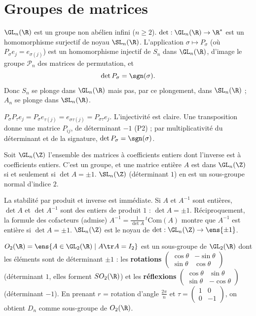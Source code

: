 \section{Groupes de matrices}
\begin{proposition}\label{prop-gl}
$\GL_n(\R)$ est un groupe non abélien infini ($n\ge2$). $\det:\GL_n(\R)\to\R^*$ est un homomorphisme surjectif de noyau $\SL_n(\R)$. L'application $\sigma\mapsto P_\sigma$ (où $P_\sigma e_j=e_{\sigma(j)}$) est un homomorphisme injectif de $S_n$ dans $\GL_n(\R)$, d'image le groupe $\mathcal P_n$ des matrices de permutation, et
\[\det P_\sigma=\sgn(\sigma).\]
Donc $S_n$ se plonge dans $\GL_n(\R)$ mais pas, par ce plongement, dans $\SL_n(\R)$ ; $A_n$ se plonge dans $\SL_n(\R)$.
\end{proposition}
\begin{preuve}
$P_\sigma P_\tau e_j=P_\sigma e_{\tau(j)}=e_{\sigma\tau(j)}=P_{\sigma\tau}e_j$. L'injectivité est claire. Une transposition donne une matrice $P_{ij}$, de déterminant $-1$ (P2) ; par multiplicativité du déterminant et de la signature, $\det P_\sigma=\sgn(\sigma)$.
\end{preuve}
\begin{proposition}
Soit $\GL_n(\Z)$ l'ensemble des matrices à coefficients entiers dont l'inverse est à coefficients entiers. C'est un groupe, et une matrice entière $A$ est dans $\GL_n(\Z)$ si et seulement si $\det A=\pm1$. $\SL_n(\Z)$ (déterminant $1$) en est un sous-groupe normal d'indice $2$.
\end{proposition}
\begin{preuve}
La stabilité par produit et inverse est immédiate. Si $A$ et $A^{-1}$ sont entières, $\det A$ et $\det A^{-1}$ sont des entiers de produit $1$ : $\det A=\pm1$. Réciproquement, la formule des cofacteurs (admise) $A^{-1}=\frac1{\det A}\,{}^t\mathrm{Com}(A)$ montre que $A^{-1}$ est entière si $\det A=\pm1$. $\SL_n(\Z)$ est le noyau de $\det:\GL_n(\Z)\to\ens{\pm1}$.
\end{preuve}
\begin{proposition}
$O_2(\R)=\ens{A\in\GL_2(\R)\mid A\tr A=I_2}$ est un sous-groupe de $\GL_2(\R)$ dont les éléments sont de déterminant $\pm1$ : les \textbf{rotations} $\begin{pmatrix}\cos\theta&-\sin\theta\\\sin\theta&\cos\theta\end{pmatrix}$ (déterminant $1$, elles forment $SO_2(\R)$) et les \textbf{réflexions} $\begin{pmatrix}\cos\theta&\sin\theta\\\sin\theta&-\cos\theta\end{pmatrix}$ (déterminant $-1$). En prenant $r$ = rotation d'angle $\frac{2\pi}n$ et $\tau=\begin{pmatrix}1&0\\0&-1\end{pmatrix}$, on obtient $D_n$ comme sous-groupe de $O_2(\R)$.
\end{proposition}
